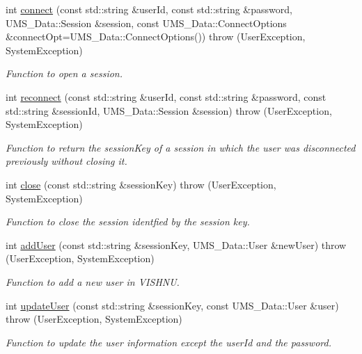 \begin{DoxyCompactItemize}
int \hyperlink{namespacevishnu_ac58b058a6a467a21f7eb21192617c90f}{connect} (const std::string \&userId, const std::string \&password, UMS\_\-Data::Session \&session, const UMS\_\-Data::ConnectOptions \&connectOpt=UMS\_\-Data::ConnectOptions())  throw (UserException, SystemException)
\begin{DoxyCompactList}\small\item\em Function to open a session. \item\end{DoxyCompactList}\item 
int \hyperlink{namespacevishnu_ae120231ba899d68724dc972374206745}{reconnect} (const std::string \&userId, const std::string \&password, const std::string \&sessionId, UMS\_\-Data::Session \&session)  throw (UserException, SystemException)
\begin{DoxyCompactList}\small\item\em Function to return the sessionKey of a session in which the user was disconnected previously without closing it. \item\end{DoxyCompactList}\item 
int \hyperlink{namespacevishnu_a925f5cdd60d012ebd98cd328ed60d398}{close} (const std::string \&sessionKey)  throw (UserException, SystemException)
\begin{DoxyCompactList}\small\item\em Function to close the session identfied by the session key. \item\end{DoxyCompactList}\item 
int \hyperlink{namespacevishnu_ac7cd83030f8f6e990001b238a9f50640}{addUser} (const std::string \&sessionKey, UMS\_\-Data::User \&newUser)  throw (UserException, SystemException)
\begin{DoxyCompactList}\small\item\em Function to add a new user in VISHNU. \item\end{DoxyCompactList}\item 
int \hyperlink{namespacevishnu_a1446b24fda1ed0ca910686635b6bb956}{updateUser} (const std::string \&sessionKey, const UMS\_\-Data::User \&user)  throw (UserException, SystemException)
\begin{DoxyCompactList}\small\item\em Function to update the user information except the userId and the password. \item\end{DoxyCompactList}\item 

\end{DoxyCompactItemize}
